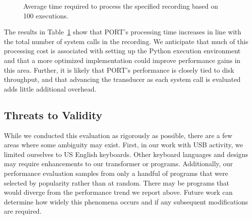 \begin{figure}[t]
\centering
\small
{}
\caption{Average time required to process the specified recording based on 100 executions.}
\label{tbl:RealWorldPerformance}
\end{figure}


The results in Table~\ref{tbl:RealWorldPerformance} show that
PORT's
processing time increases in line with the total number of system calls
in the recording.  We anticipate that much of this processing cost is
associated with setting up the Python execution environment and that a more
optimized implementation could improve performance gains in this area.
Further,
it is likely that PORT's performance is closely tied to
disk throughput,
and that advancing the transducer
as each system call is evaluated
adds little additional overhead.


\subsection{Threats to Validity}

While we conducted this evaluation as rigorously as possible,
there are a few areas where some ambiguity may exist.
First, in our work with USB activity, we limited ourselves to US English
keyboards.  Other keyboard languages and designs may require enhancements to our transformer or programs.  Additionally, our performance evaluation samples from only a handful
of programs that were selected by popularity rather than at random.
There may be programs that would diverge from the performance trend we report above. Future work can determine how widely this phenomena occurs and if any subsequent modifications are required.


